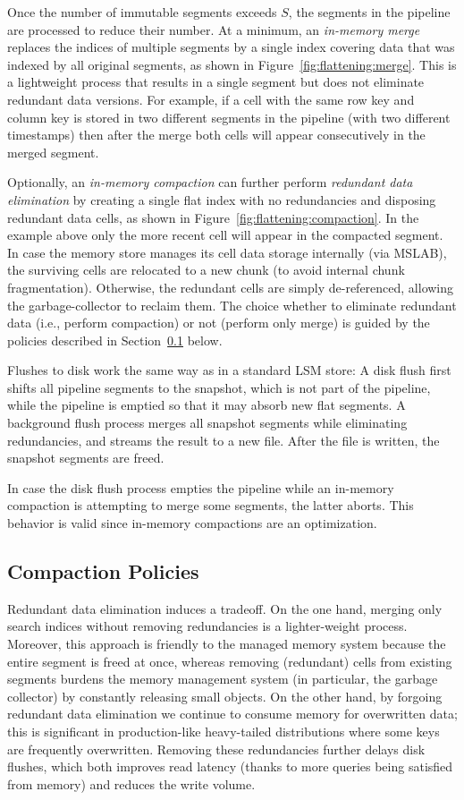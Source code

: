Once the number of immutable segments exceeds $S$, the segments in the pipeline are processed to reduce their number.
At a minimum, an \emph{in-memory merge} replaces the indices of multiple segments by a single index covering data that was 
indexed by all original segments,  
as shown in Figure~\ref{fig:flattening:merge}. 
This is a lightweight process that results in a single segment but does not eliminate redundant data versions.
For example, if a cell with the same row key and column key is stored in two different segments in the pipeline (with two different timestamps) then after the merge both cells will appear consecutively in the merged segment. 

Optionally, an \emph{in-memory compaction} can further perform \emph{redundant data elimination} by
creating a single flat index with no redundancies and disposing redundant data cells,  
as shown in Figure~\ref{fig:flattening:compaction}.  
In the example above only the more recent cell will appear in the compacted segment.
In case the memory store manages its cell data storage internally (via MSLAB), the surviving cells are relocated
to a new chunk (to avoid internal chunk fragmentation). Otherwise, the redundant cells are simply de-referenced, allowing the garbage-collector to reclaim them.    
%
The choice whether to eliminate redundant data (i.e., perform compaction) or not (perform only merge) is guided by the policies described in Section~\ref{ssec:policies} below.

Flushes to disk work the same way as in a standard LSM store: A disk flush first shifts all pipeline segments to the snapshot, which is not part of the pipeline, while the pipeline is emptied so that
it may absorb new flat segments. 
A background flush process merges all snapshot segments while eliminating  redundancies, and streams the result to a new file. 
After the file is written, the snapshot segments are freed. 

In case the disk flush process empties the pipeline while an in-memory compaction  is attempting to merge some segments, the latter aborts.  This behavior is valid since in-memory compactions are an optimization.

\subsection{Compaction Policies} \label{ssec:policies}

Redundant data elimination induces a tradeoff. On the one hand,
merging only search indices without removing redundancies is a lighter-weight process.  
Moreover, this approach is friendly to the managed memory system because the entire segment is freed at once, whereas 
removing (redundant) cells from existing segments burdens the memory management system (in particular, the garbage collector) by
constantly releasing small objects. On the other hand, by forgoing redundant data elimination we continue to 
consume memory for overwritten data; this is significant in production-like heavy-tailed distributions where some keys are frequently overwritten.
Removing these redundancies further delays disk flushes, which both improves read latency  (thanks to more 
queries being satisfied from memory) and reduces the write volume.

